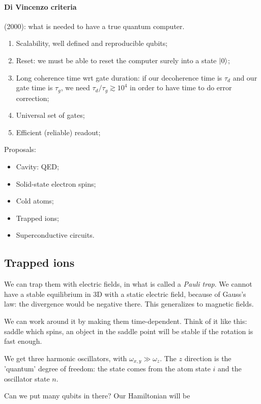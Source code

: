 \documentclass[main.tex]{subfiles}
\begin{document}
\paragraph{Di Vincenzo criteria} (2000): what is needed to have a true quantum computer.

\begin{enumerate}
    \item Scalability, well defined and reproducible qubits;
    \item Reset: we must be able to reset the computer surely into a state \(\ket{0} \);
    \item Long coherence time wrt gate duration: if our decoherence time is \(\tau_d\) and our gate time is \(\tau_g\), we need \(\tau_d / \tau_g \gtrsim 10^4\) in order to have time to do error correction;
    \item Universal set of gates;
    \item Efficient (reliable) readout;
\end{enumerate}


Proposals:

\begin{itemize}
    \item Cavity: QED;
    \item Solid-state electron spins;
    \item Cold atoms;
    \item Trapped ions;
    \item Superconductive circuits.
\end{itemize}

\subsection{Trapped ions}

We can trap them with electric fields, in what is called a \emph{Pauli trap}.
We cannot have a stable equilibrium in 3D with a static electric field, because of Gauss's law: the divergence would be negative there. This generalizes to magnetic fields.

We can work around it by making them time-dependent. Think of it like this: saddle which spins, an object in the saddle point will be stable if the rotation is fast enough.

We get three harmonic oscillators, with \(\omega_{x,y} \gg \omega_z\). The \(z\) direction is the 'quantum' degree of freedom: the state comes from the atom state \(i\) and the oscillator state \(n\).

Can we put many qubits in there? Our Hamiltonian will be
\end{document}
